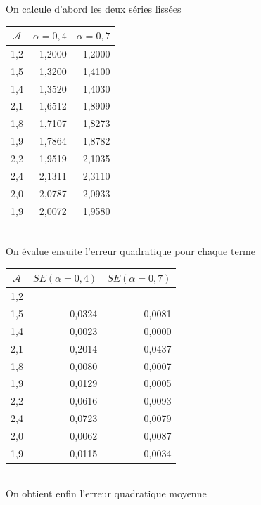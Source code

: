 \begin{solution}{1.4}
On calcule d'abord les deux séries lissées \\

\begin{tabular}{|l|r|r|}
\hline
\multicolumn{1}{|c|}{$\mathcal{A}$} & $\alpha=0,4$ & $\alpha=0,7$ \\ \hline
1,2 & 1,2000 & 1,2000 \\ \hline
1,5 & 1,3200 & 1,4100 \\ \hline
1,4 & 1,3520 & 1,4030 \\ \hline
2,1 & 1,6512 & 1,8909 \\ \hline
1,8 & 1,7107 & 1,8273 \\ \hline
1,9 & 1,7864 & 1,8782 \\ \hline
2,2 & 1,9519 & 2,1035 \\ \hline
2,4 & 2,1311 & 2,3110 \\ \hline
2,0 & 2,0787 & 2,0933 \\ \hline
1,9 & 2,0072 & 1,9580 \\ \hline
\end{tabular} \\

On évalue ensuite l'erreur quadratique pour chaque terme \\

\begin{tabular}{|l|r|r|}
\hline
\multicolumn{1}{|c|}{$\mathcal{A}$} & \multicolumn{1}{l|}{$SE(\alpha=0,4)$} & \multicolumn{1}{l|}{$SE(\alpha=0,7)$} \\ \hline
1,2 & \multicolumn{1}{l|}{} & \multicolumn{1}{l|}{} \\ \hline
1,5 & 0,0324 & 0,0081 \\ \hline
1,4 & 0,0023 & 0,0000 \\ \hline
2,1 & 0,2014 & 0,0437 \\ \hline
1,8 & 0,0080 & 0,0007 \\ \hline
1,9 & 0,0129 & 0,0005 \\ \hline
2,2 & 0,0616 & 0,0093 \\ \hline
2,4 & 0,0723 & 0,0079 \\ \hline
2,0 & 0,0062 & 0,0087 \\ \hline
1,9 & 0,0115 & 0,0034 \\ \hline
\end{tabular} \\

On obtient enfin l'erreur quadratique moyenne\\


\end{solution}
